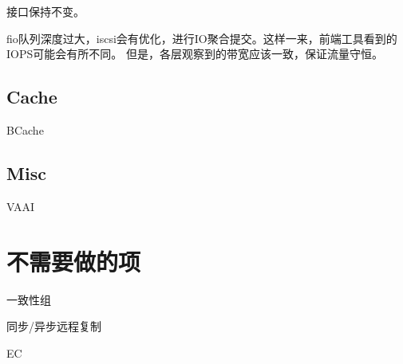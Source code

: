 接口保持不变。

\begin{tcolorbox}
fio队列深度过大，iscsi会有优化，进行IO聚合提交。这样一来，前端工具看到的IOPS可能会有所不同。
但是，各层观察到的带宽应该一致，保证流量守恒。
\end{tcolorbox}

\subsection{Cache}

BCache

\subsection{Misc}

VAAI

\section{不需要做的项}

\begin{enumbox}
\item 一致性组
\item 同步/异步远程复制
\item EC
\end{enumbox}
